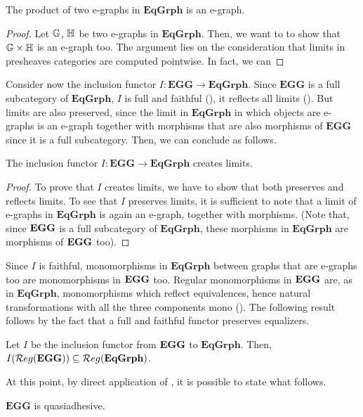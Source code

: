 \begin{prop}\label{prop:prod_of_EGGs_is_EGG}
    The product of two e-graphs in $\mathbf{EqGrph}$ is an e-graph.
\end{prop}

\begin{proof}
    Let $\mathbb{G}$, $\mathbb{H}$ be two e-graphs in $\mathbf{EqGrph}$. Then, we want to to show that $\mathbb{G \times H}$ is an e-graph too. The argument lies on the consideration that limits in presheaves categories are computed pointwise. In fact, we can 
\end{proof}

Consider now the inclusion functor $I: \mathbf{EGG} \rightarrow \mathbf{EqGrph}$. Since $\mathbf{EGG}$ is a full subcategory of $\mathbf{EqGrph}$, $I$ is full and faithful (), it reflects all limits (). But limits are also preserved, since the limit in $\mathbf{EqGrph}$ in which objects are e-graphs is an e-graph together with morphisms that are also morphisms of $\mathbf{EGG}$ since it is a full subcategory. Then, we can conclude as follows.

\begin{lemma}
    The inclusion functor $I: \mathbf{EGG \rightarrow EqGrph}$ creates limits.
\end{lemma}

\begin{proof}
    To prove that $I$ creates limits, we have to show that both preserves and reflects limits.
    To see that $I$ preserves limits, it is sufficient to note that a limit of e-graphs in $\mathbf{EqGrph}$ is again an e-graph, together with morphisms. (Note that, since $\mathbf{EGG}$ is a full subcategory of $\mathbf{EqGrph}$, these morphisms in $\mathbf{EqGrph}$ are morphisms of $\mathbf{EGG}$ too).
\end{proof}

Since $I$ is faithful, monomorphisms in $\mathbf{EqGrph}$ between graphs that are e-graphs too are monomorphisms in $\mathbf{EGG}$ too. Regular monomorphisms in $\mathbf{EGG}$ are, as in $\mathbf{EqGrph}$, monomorphisms which reflect equivalences, hence natural transformations with all the three components mono (). The following result follows by the fact that a full and faithful functor preserves equalizers. {\color{red}{???? Da dimostrare}}

\begin{prop}
    Let $I$ be the inclusion functor from $\mathbf{EGG}$ to $\mathbf{EqGrph}$. Then, $I(\mathcal{R}eg(\mathbf{EGG})) \subseteq \mathcal{R}eg(\mathbf{EqGrph})$.
\end{prop}

At this point, by direct application of , it is possible to state what follows.

\begin{cor}
    $\mathbf{EGG}$ is quasiadhesive.
\end{cor}
